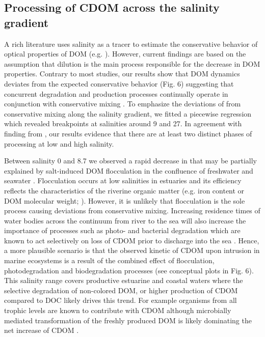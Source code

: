 \subsection*{Processing of CDOM across the salinity gradient}

A rich literature uses salinity as a tracer to estimate the conservative behavior of optical properties of DOM (e.g. \cite{Kowalczuk2010, Asmala2016}). However, current findings are based on the assumption that dilution is the main process responsible for the decrease in DOM properties. Contrary to most studies, our results show that DOM dynamics deviates from the expected conservative behavior (Fig. 6) suggesting that concurrent degradation and production processes continually operate in conjunction with conservative mixing \citep{Markager2011, Goncalves2015}. To emphasize the deviations of  from conservative mixing along the salinity gradient, we fitted a piecewise regression which revealed breakpoints at salinities around 9 and 27. In agreement with finding from \citet{Goncalves2015}, our results evidence that there are at least two distinct phases of processing at low and high salinity. 

Between salinity 0 and 8.7 we observed a rapid decrease in  that may be partially explained by salt-induced DOM flocculation in the confluence of freshwater and seawater \citep{Sholkovitz1976, Sondergaard2003}. Flocculation occurs at low salinities in estuaries and its efficiency reflects the characteristics of the riverine organic matter (e.g. iron content or DOM molecular weight; \cite{Mayer1982, Forsgren1996, Asmala2014a}). However, it is unlikely that flocculation is the sole process causing deviations from conservative mixing. Increasing residence times of water bodies across the continuum from river to the sea will also increase the importance of processes such as photo- and bacterial degradation which are known to act selectively on loss of CDOM prior to discharge into the sea \citep{Weyhenmeyer2012}. Hence, a more plausible scenario is that the observed kinetic of CDOM upon intrusion in marine ecosystems is a result of the combined effect of flocculation, photodegradation and biodegradation processes (see conceptual plots in Fig. 6). This salinity range covers productive estuarine and coastal waters where the selective degradation of non-colored DOM, or higher production of CDOM compared to DOC likely drives this trend. For example organisms from all trophic levels are known to contribute with CDOM \citep{Steinberg2004, Stedmon2014} although microbially mediated transformation of the freshly produced DOM is likely dominating the net increase of CDOM \citep{Rochelle-Newall2002, Yamashita2004}.

